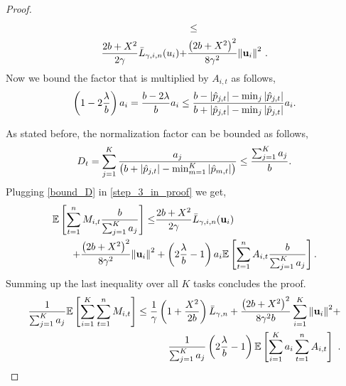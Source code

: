 {\begin{proof}
\begin{equation}
\begin{split}
&\le \\ \frac{2b+X^2}{2\gamma}{\bar
  L}_{\gamma,i,n}(u_i)+&\frac{\left({2b+X^2}\right)^2}{8{\gamma}^2}{\left\Vert
    \mathbf{u}_{i} \right\Vert}^2~.
\label{step_3_in_proof_prior}
\end{split}
\end{equation}
Now we bound the factor that is multiplied by $A_{i,t}$ as follows,
\begin{equation*}
\left({1-2\frac{\lambda}{b}}\right)a_{i}=\frac{b-2\lambda}{b} a_{i}\le\frac{b-\left\vert{\hat{p}_{j,t}}\right\vert-\min_{j}{\left\vert{\hat{p}_{j,t}}\right\vert }}{b+\left\vert{\hat{p}_{j,t}}\right\vert-\min_{j}{\left\vert{\hat{p}_{j,t}}\right\vert}}a_{i}.
\end{equation*}

As stated before, the    normalization factor can be bounded as
follows,
\begin{equation*}
D_{t}=\sum_{j=1}^K\frac{a_{j}}{\left({b+\left\vert{\hat{p}_{j,t}}\right\vert-\min_{m=1}^K\left\vert{\hat{p}_{m,t}}\right\vert}\right)}\le \frac{\sum_{j=1}^Ka_{j}}{b}.
\end{equation*}
Plugging \eqref{bound_D} in \eqref{step_3_in_proof} we get,
\begin{equation}\label{eq:bound_for_i}
\begin{split}
\mathbb{E}\left[ \sum_{t=1}^{n}{M_{i,t}\frac{b}{\sum_{j=1}^Ka_{j}}} \right]
\le& \frac{2b+X^2}{2\gamma}{\bar L}_{\gamma,i,n}(\mathbf{u}_{i})\\
+\frac{\left({2b+X^2}\right)^2}{8{\gamma}^2}{\left\Vert \mathbf{u}_{i} \right\Vert}^2&+\left({2\frac{\lambda}{b}-1}\right)a_{i}\mathbb{E}\left[{\sum_{t=1}^{n}{A_{i,t}\frac{b}{\sum_{j=1}^Ka_{j}}}}\right].
\end{split}
\end{equation}
Summing up the last inequality over all $K$ tasks concludes the proof.
\begin{equation}
\begin{split}
\frac{1}{\sum_{j=1}^Ka_{j}}\mathbb{E}\left[ \sum_{i=1}^{K}\sum_{t=1}^{n}{M_{i,t}} \right]
\le\frac{1}{\gamma}\left(1+\frac{X^2}{2b} \right){\bar L}_{\gamma,n}+
\frac{\left({2b+X^2}\right)^2}{8{\gamma}^2b}\sum_{i=1}^{K}{{\left\Vert \mathbf{u}_{i} \right\Vert}^2}+\\ \frac{1}{\sum_{j=1}^Ka_{j}}\left({2\frac{\lambda}{b}-1}\right)\mathbb{E}\left[{\sum_{i=1}^{K}a_{i}\sum_{t=1}^{n}{A_{i,t}}}\right]~.
\end{split}
\label{final_eq}
\end{equation}


\end{proof}}
